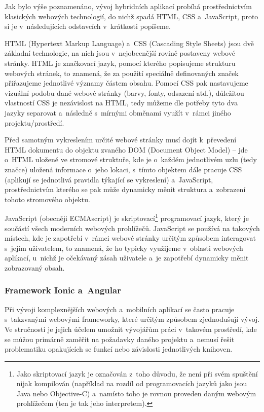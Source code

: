 Jak bylo výše poznamenáno, vývoj hybridních aplikací probíhá
prostřednictvím klasických webových technologií, do nichž spadá HTML,
CSS a~JavaScript, proto si je v~následujících odstavcích v~krátkosti
popíšeme.

HTML (Hypertext Markup Language) a~CSS (Cascading Style Sheets) jsou dvě
základní technologie, na nich jsou v~nejobecnější rovině postaveny
webové stránky. HTML je značkovací jazyk, pomocí kterého popisujeme
strukturu webových stránek, to znamená, že za použití speciálně
definovaných značek přiřazujeme jednotlivé významy částem obsahu. Pomocí
CSS pak nastavujeme vizuální podobu dané webové stránky (barvy, fonty,
odsazení atd.), důležitou vlastností CSS je nezávislost na HTML, tedy
můžeme dle potřeby tyto dva jazyky separovat a~následně s~mírnými
obměnami využít v~rámci jiného projektu/prostředí.~\parencite{htmlcss}

Před samotným vykreslením určité webové stránky musí dojít k~převedení
HTML dokumentu do objektu zvaného DOM (Document Object Model) -- jde
o~HTML uložené ve stromové struktuře, kde je o~každém jednotlivém uzlu
(tedy značce) uložená informace o~jeho lokaci, s~tímto objektem dále
pracuje CSS (aplikují se jednotlivá pravidla týkající se vykreslení)
a~JavaScript, prostřednictvím kterého se pak může dynamicky měnit
struktura a~zobrazení tohoto stromového objektu.
\parencite{howbrowserswork}

JavaScript (obecněji ECMAscript) je
skriptovací\footnote{Jako skriptovací jazyk je označován z~toho důvodu, že není při svém spuštění nijak kompilován (například na rozdíl od programovacích jazyků jako jsou Java nebo Objective-C) a~namísto toho je rovnou proveden daným webovým prohlížečem (ten je tak jeho interpretem).}
programovací jazyk, který je součástí všech moderních webových
prohlížečů. JavaScript se používá na takových místech, kde je zapotřebí
v~rámci webové stránky určitým způsobem interagovat s~jejím uživatelem,
to znamená, že ho typicky využijeme v~oblasti webových aplikací, u~nichž
je očekávaný zásah uživatele a~je zapotřebí dynamicky měnit zobrazovaný
obsah.~\parencite{javascript}

\hypertarget{framework-ionic-a-angular}{%
\subsubsection{Framework Ionic a~Angular}\label{framework-ionic-a-angular}}

Při vývoji komplexnějších webových a~mobilních aplikací se často pracuje
s~takzvanými webovými frameworky, které určitým způsobem zjednodušují
vývoj. Ve stručnosti je jejich účelem umožnit vývojářům práci v~takovém
prostředí, kde se můžou primárně zaměřit na požadavky daného projektu
a~nemusí řešit problematiku opakujících se funkcí nebo závislosti
jednotlivých knihoven.

